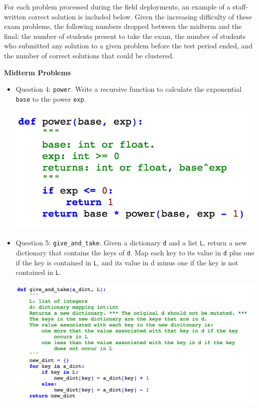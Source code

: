 
For each problem processed during the field deployments, an example of a staff-written correct solution is included below. Given the increasing difficulty of these exam problems, the following numbers dropped between the midterm and the final: the number of students present to take the exam, the number of students who submitted any solution to a given problem before the test period ended, and the number of correct solutions that could be clustered.

{\bf Midterm Problems}

\begin{itemize}
\item Question 4: \texttt{power}. Write a recursive function to calculate the exponential \texttt{base} to the power \texttt{exp}.

\includegraphics[scale=0.65]{Body/figures/grovercode/fig_power}

\item Question 5: \texttt{give\_and\_take}. Given a dictionary \texttt{d} and a list \texttt{L}, return a new dictionary that contains the keys of \texttt{d}. Map each key to its value in \texttt{d} plus one if the key is contained in \texttt{L}, and its value in d minus one if the key is not contained in \texttt{L}.

\includegraphics[scale=0.65]{Body/figures/grovercode/fig_give_and_take}


\end{itemize}
